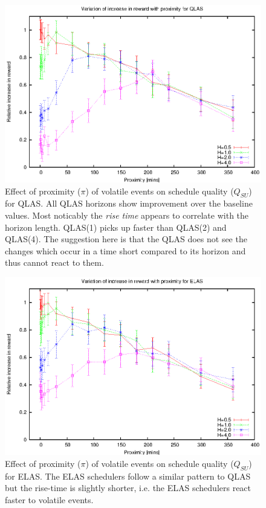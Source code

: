 \begin{figure}[htbp]
\begin{center}
    \includegraphics[scale=1.0, angle=0]{figures/vdv.eps}
\end{center}
\caption[Effect of proximity ($\pi$) of volatile events on schedule quality ($Q_{SU}$) for QLAS.]
{Effect of proximity ($\pi$) of volatile events on schedule quality ($Q_{SU}$) for QLAS. All QLAS horizons show improvement over the baseline values. Most noticably the \emph{rise time} appears to correlate with the horizon length. QLAS(1) picks up faster than QLAS(2) and QLAS(4). The suggestion here is that the QLAS does not see the changes which occur in a time short compared to its horizon and thus cannot react to them.}
\label{fig:vol_qlas_pi}
\end{figure}


\begin{figure}[htbp]
\begin{center}
    \includegraphics[scale=1.0, angle=0]{figures/edv.eps}
\end{center}
\caption[Effect of proximity ($\pi$) of volatile events on schedule quality ($Q_{SU}$) for ELAS.]
{Effect of proximity ($\pi$) of volatile events on schedule quality ($Q_{SU}$) for ELAS. The ELAS schedulers follow a similar pattern to QLAS but the rise-time is slightly shorter, i.e. the ELAS schedulers react faster to volatile events.}
\label{fig:vol_elas_pi}
\end{figure}

